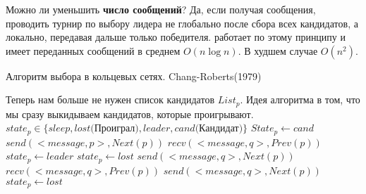 Можно ли уменьшить \textbf{число сообщений}? Да, если получая сообщения, проводить турнир по выбору лидера не глобально после сбора всех кандидатов, а локально, передавая дальше только победителя.  работает по этому принципу и имеет переданных сообщений в среднем $O(n\log n)$. В худшем случае $O(n^2)$.
\begin{algorithm}
\caption{Алгоритм выбора в кольцевых сетях. Chang-Roberts(1979)}
\label{algRoberts}
\begin{algorithmic}
\State Теперь нам больше не нужен список кандидатов $List_p$. Идея алгоритма в том, что мы сразу выкидываем кандидатов, которые проигрывают.
\State $state_p \in \{sleep, lost\text{(Проиграл)}, leader, cand\text{(Кандидат)}\}$ 
    \State $State_p \gets cand$
    \State $send(<message, p>, Next(p))$ 
        \State $recv(<message, q>, Prev(p))$ 
            $state_p \gets leader$
         
                \State $state_p \gets lost$
                \State $send(<message, q>, Next(p))$
            \EndIf
        \EndIf
    \EndWhile
\Else[Не инициаторы] 
        \State $recv(<message, q>, Prev(p))$ 
        \State $send(<message, q>, Next(p))$ 
            \State $state_p \gets lost$
        \EndIf
    \EndWhile
\EndIf 
\end{algorithmic}
\end{algorithm}

